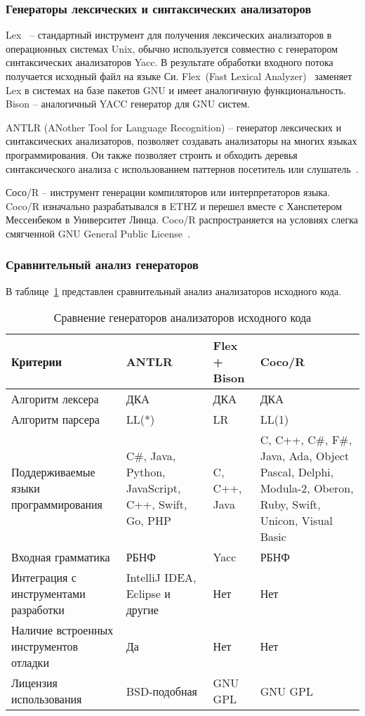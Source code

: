 \subsubsection*{Генераторы лексических и синтаксических анализаторов}


Lex~\cite{lesk1975lex} -- стандартный инструмент для получения лексических анализаторов в операционных системах Unix, обычно используется совместно с генератором синтаксических анализаторов Yacc.
В результате обработки входного потока получается исходный файл на языке Си.
Flex~(Fast Lexical Analyzer)~\cite{flexdoc} заменяет Lex в системах на базе пакетов GNU и имеет аналогичную функциональность.
Bison -- аналогичный YACC генератор для GNU систем.

ANTLR (ANother Tool for Language Recognition) -- генератор лексических и синтаксических анализаторов, позволяет создавать анализаторы на многих языках программирования.
Он также позволяет строить и обходить деревья синтаксического анализа с использованием паттернов посетитель или слушатель~\cite{parr2013definitive}.

Сосо/R -- инструмент генерации компиляторов или интерпретаторов языка.
Coco/R изначально разрабатывался в ETHZ и перешел вместе с Ханспетером Мессенбеком в Университет Линца.
Coco/R распространяется на условиях слегка смягченной GNU General Public License~\cite{cocordoc}.




\subsubsection*{Сравнительный анализ генераторов}


В таблице~\ref{tab:parser-analis} представлен сравнительный анализ анализаторов исходного кода.

\begin{table}[]
    \centering
    \caption{Сравнение генераторов анализаторов исходного кода}
    \label{tab:parser-analis}
    \begin{tabular}{|p{4.5cm}|p{3cm}|p{3cm}|p{4.5cm}|}
        \hline
        Критерии & ANTLR & Flex + Bison & Coco/R \\ \hline
        Алгоритм лексера & ДКА & ДКА & ДКА\\ \hline
        Алгоритм парсера & LL(*) & LR & LL(1) \\ \hline
        Поддерживаемые языки программирования & C\#, Java, Python, JavaScript, C++, Swift, Go, PHP & C, C++, Java & C, C++, C\#, F\#, Java, Ada, Object Pascal, Delphi, Modula-2, Oberon, Ruby, Swift, Unicon, Visual Basic \\ \hline
        Входная грамматика & РБНФ & Yacc & РБНФ \\ \hline
        Интеграция с инструментами разработки & IntelliJ IDEA, Eclipse и другие & Нет & Нет \\ \hline
        Наличие встроенных инструментов отладки & Да & Нет & Нет \\ \hline
        Лицензия использования & BSD-подобная & GNU GPL & GNU GPL\\ \hline
    \end{tabular}
\end{table}


